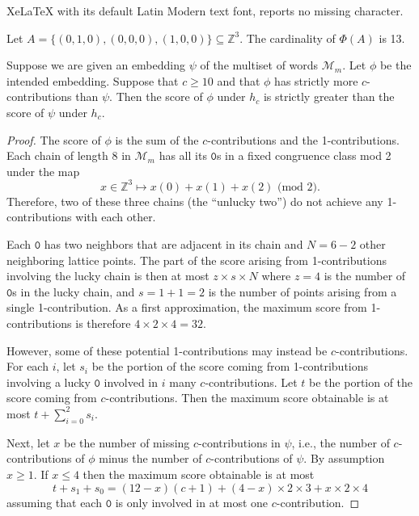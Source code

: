 \documentclass[10pt,a4paper]{amsart}
\newcommand{\mt}{\mathtt}
\begin{document}
XeLaTeX with its default Latin Modern text font, reports no missing character.
\begin{lemma}\label{thirteen-neighbors}
	Let $A = \{(0,1,0), (0,0,0), (1,0,0)\} \subseteq \mathbb Z^3$.
	The cardinality of $\Phi(A)$ is 13.
\end{lemma}

\begin{lemma}\label{levels-required}
	Suppose we are given an embedding $\psi$ of the multiset of words $\mathscr M_m$.
	Let $\phi$ be the intended embedding.
	Suppose that $c\ge 10$ and that $\phi$ has strictly more $c$-contributions than $\psi$.
	Then the score of $\phi$ under $h_c$ is strictly greater than the score of $\psi$ under $h_c$.
\end{lemma}

\begin{proof}
	The score of $\phi$ is the sum of the $c$-contributions and the 1-contributions.
	Each chain of length 8 in $\mathscr M_m$ has all its $\mt 0$s in a fixed congruence class mod 2
	under the map
	\[
		x\in \mathbb Z^3 \mapsto x(0)+x(1)+x(2)\text{ (mod 2).}
	\]
	Therefore, two of these three chains (the ``unlucky two'') do not achieve any 1-contributions with each other.

	Each $\mt 0$ has two neighbors that are adjacent in its chain and $N=6-2$ other neighboring lattice points.
	The part of the score arising from 1-contributions involving the lucky chain is then at most $z \times s \times N$
	where $z=4$ is the number of $\mt 0$s in the lucky chain, and $s=1+1=2$ is the number of points arising from a single 1-contribution.
	As a first approximation, the maximum score from 1-contributions is therefore $4\times 2\times 4 = 32$.

	However, some of these potential 1-contributions may instead be $c$\--contributions.
	For each $i$, let $s_i$ be the portion of the score coming from 1-contributions involving a lucky $\mt 0$ involved in $i$ many $c$-contributions.
	Let $t$ be the portion of the score coming from $c$-contributions.
	Then the maximum score obtainable is at most $t+\sum_{i=0}^2 s_i$.

	Next, let $x$ be the number of missing $c$-contributions in $\psi$, i.e., the number of $c$-contributions of $\phi$
	minus the number of $c$-contributions of $\psi$.
	By assumption $x\ge 1$.
	If $x\le 4$ then the maximum score obtainable is at most
	\begin{equation}\label{bound}
		t + s_1 + s_0 = (12-x)(c+1) + (4-x)\times 2\times 3 + x \times 2 \times 4
	\end{equation}
	assuming that each $\mt 0$ is only involved in at most one $c$-contribution.


\end{proof}
\end{document}
